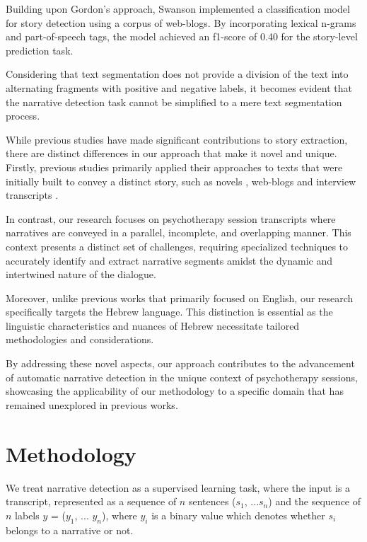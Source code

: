 \documentclass[preprint,12pt]{elsarticle}
\begin{document}
Building upon Gordon's approach, Swanson \cite{swansonfirst} implemented a classification model for story detection using a corpus of web-blogs. By incorporating lexical n-grams and part-of-speech tags, the model achieved an f1-score of 0.40 for the story-level prediction task.

Considering that text segmentation does not provide a division of the text into alternating fragments with positive and negative labels, it becomes evident that the narrative detection task cannot be simplified to a mere text segmentation process.

While previous studies have made significant contributions to story extraction, there are distinct differences in our approach that make it novel and unique. Firstly, previous studies primarily applied their approaches to texts that were initially built to convey a distinct story, such as novels  \cite{iikura2021paragraph}, web-blogs \cite{swansonfirst} and interview transcripts \cite{gordon2007automated}.

In contrast, our research focuses on psychotherapy session transcripts where narratives are conveyed in a parallel, incomplete, and overlapping manner. This context presents a distinct set of challenges, requiring specialized techniques to accurately identify and extract narrative segments amidst the dynamic and intertwined nature of the dialogue.

Moreover, unlike previous works that primarily focused on English, our research specifically targets the Hebrew language. This distinction is essential as the linguistic characteristics and nuances of Hebrew necessitate tailored methodologies and considerations.

By addressing these novel aspects, our approach contributes to the advancement of automatic narrative detection in the unique context of psychotherapy sessions, showcasing the applicability of our methodology to a specific domain that has remained unexplored in previous works.

\section{Methodology}

We treat narrative detection as a supervised learning task, where the input is a transcript, represented as a sequence of $n$ sentences ($s_{1}$, ...$s_{n}$) and the sequence of $n$ labels $y$ = ($y_{1}$, ... $y_{n}$), where $y_{i}$ is a binary value which denotes whether $s_{i}$ belongs to a narrative or not.
\end{document}
